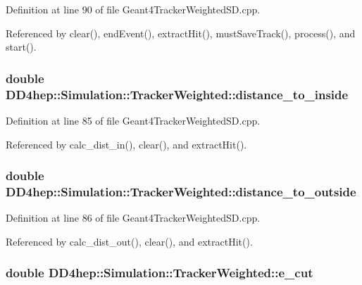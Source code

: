 Definition at line 90 of file Geant4TrackerWeightedSD.cpp.

Referenced by clear(), endEvent(), extractHit(), mustSaveTrack(), process(), and start().\hypertarget{struct_d_d4hep_1_1_simulation_1_1_tracker_weighted_a77ce382a300e188a9ed772615abfa4f2}{
\subsubsection[{distance\_\-to\_\-inside}]{\setlength{\rightskip}{0pt plus 5cm}double {\bf DD4hep::Simulation::TrackerWeighted::distance\_\-to\_\-inside}}}
\label{struct_d_d4hep_1_1_simulation_1_1_tracker_weighted_a77ce382a300e188a9ed772615abfa4f2}


Definition at line 85 of file Geant4TrackerWeightedSD.cpp.

Referenced by calc\_\-dist\_\-in(), clear(), and extractHit().\hypertarget{struct_d_d4hep_1_1_simulation_1_1_tracker_weighted_ad898a4f6ed0a4424a2bd8f7d52292c32}{
\subsubsection[{distance\_\-to\_\-outside}]{\setlength{\rightskip}{0pt plus 5cm}double {\bf DD4hep::Simulation::TrackerWeighted::distance\_\-to\_\-outside}}}
\label{struct_d_d4hep_1_1_simulation_1_1_tracker_weighted_ad898a4f6ed0a4424a2bd8f7d52292c32}


Definition at line 86 of file Geant4TrackerWeightedSD.cpp.

Referenced by calc\_\-dist\_\-out(), clear(), and extractHit().\hypertarget{struct_d_d4hep_1_1_simulation_1_1_tracker_weighted_a404e62198a8830c8e6b7c185873bb4d1}{
\subsubsection[{e\_\-cut}]{\setlength{\rightskip}{0pt plus 5cm}double {\bf DD4hep::Simulation::TrackerWeighted::e\_\-cut}}}
\label{struct_d_d4hep_1_1_simulation_1_1_tracker_weighted_a404e62198a8830c8e6b7c185873bb4d1}



